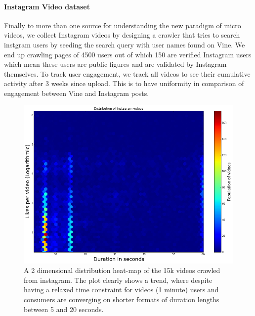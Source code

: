 \paragraph{Instagram Video dataset} Finally to more than one source for understanding the new paradigm of micro videos, we collect Instagram videos by designing a crawler that tries to search instgram users by seeding the search query with user names found on Vine. We end up crawling pages of 4500 users out of  which 150 are verified Instagram users which mean these users are public figures and are validated by Instagram themselves.  To track user engagement, we track all videos to see their cumulative activity after 3 weeks since upload. This is to have uniformity in comparison of engagement between Vine and Instagram posts. 

\begin{figure}[htb]
	\includegraphics[width=0.9\columnwidth]{plots/InstaEngagementHeatmap}
	\caption{A 2 dimensional distribution heat-map of the 15k videos crawled from instagram. The plot clearly shows a trend, where despite having a relaxed time constraint for videos (1 minute) users and consumers are converging on shorter formats of duration lengths between 5 and 20 seconds. }
	\label{fig:download-fraction}
\end{figure}




